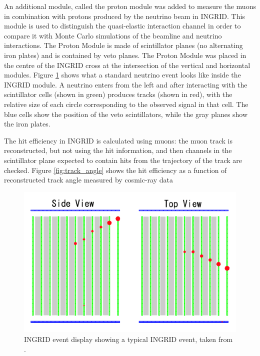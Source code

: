 An additional module, called the proton module was added to measure the muons in combination with protons produced by the neutrino beam in INGRID. This module is used to distinguish the quasi-elastic interaction channel in order to compare it with Monte Carlo simulations of the beamline and neutrino interactions. The Proton Module is made of scintillator planes (no alternating iron plates) and is contained by veto planes. The Proton Module was placed in the centre of the INGRID cross at the intersection of the vertical and horizontal modules. Figure \ref{fig:ingridevent} shows what a standard neutrino event looks like inside the INGRID module. A neutrino enters from the left and after interacting with the scintillator cells (shown in green) produces tracks (shown in red), with the relative size of each circle corresponding to the observed signal in that cell. The blue cells show the position of the veto scintillators, while the gray planes show the iron plates.   

The hit efficiency in INGRID is calculated using muons: the muon track is reconstructed, but not using the hit information, and then channels in the scintillator plane  expected to contain hits from the trajectory of the track are checked.
Figure \ref{fig:track_angle} shows the hit efficiency as a function of reconstructed track angle measured by cosmic-ray data 

\begin{figure}
    \includegraphics[width=\textwidth]{Figures/ingridevent.png}
    \caption{INGRID event display showing a typical INGRID event, taken from \cite{t2k_collaboration_t2k_2011}.}
    \label{fig:ingridevent}
\end{figure}

